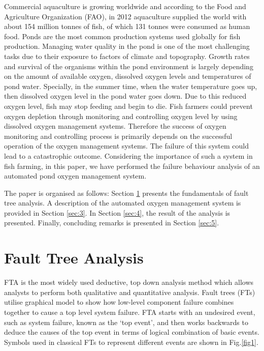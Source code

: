 \documentclass[10pt]{llncs}
\begin{document}
Commercial aquaculture is growing worldwide and  according to the Food and Agriculture Organization (FAO), in 2012 aquaculture supplied the world with about 154 million tonnes of fish, of which 131 tonnes were consumed as human food\cite{Fao2012}. Ponds are the most common production systems used globally for fish production. Managing water quality in the pond is one of the most challenging tasks due to their exposure to factors of climate and topography\cite{culberson1996}. Growth rates and survival of the organisms within the pond environment is largely depending on the amount of available oxygen, dissolved oxygen levels and temperatures of pond water\cite{boyd2002, boyd1978}. Specially, in the summer time, when the water temperature goes up, then dissolved oxygen level in the pond water goes down.  Due to this reduced oxygen level, fish may stop feeding and begin to die. Fish farmers could prevent oxygen depletion through monitoring and controlling oxygen level by using dissolved oxygen management systems. Therefore the success of oxygen monitoring and controlling process is primarily depends on the successful operation of the oxygen management systems. The failure of this system could lead to a catastrophic outcome. Considering the importance of such a system in fish farming, in this paper, we have performed the failure behaviour analysis of an automated pond oxygen management system.    

The paper is organised as follows: Section \ref{sec:2} presents the fundamentals of fault tree analysis. A description of the automated oxygen management system is provided in Section \ref{sec:3}. In Section \ref{sec:4}, the result of the analysis is presented. Finally, concluding remarks is presented in Section \ref{sec:5}.

\section{Fault Tree Analysis}
\label{sec:2}
FTA is the most widely used deductive, top down analysis method which allows analysts to perform both qualitative and quantitative analysis\cite{Alain1991, Vesely2002}. Fault trees (FTs) utilise graphical model to show how low-level component failure combines together to cause a top level system failure. FTA starts with an undesired event, such as system failure, known as the `top event', and then works backwards to deduce the causes of the top event in terms of logical combination of basic events\cite{Martin2009}. Symbols used in classical FTs to represent different events are shown in Fig.\ref{fig1}. 
\end{document}
